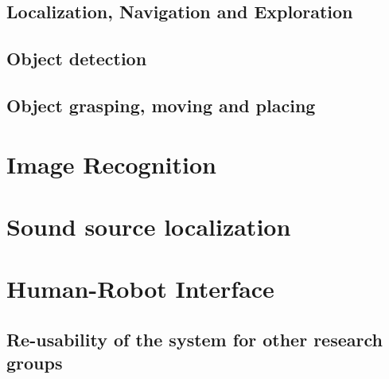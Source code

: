 \documentclass[runningheads,a4paper]{llncs}
\begin{document}
\subsection{Localization, Navigation and Exploration}


\subsection{Object detection}


\subsection{Object grasping, moving and placing}


\section{Image Recognition}


\section{Sound source localization}


%

\section{Human-Robot Interface}


%
%
%

\subsection{Re-usability of the system for other research groups}

\end{document}
